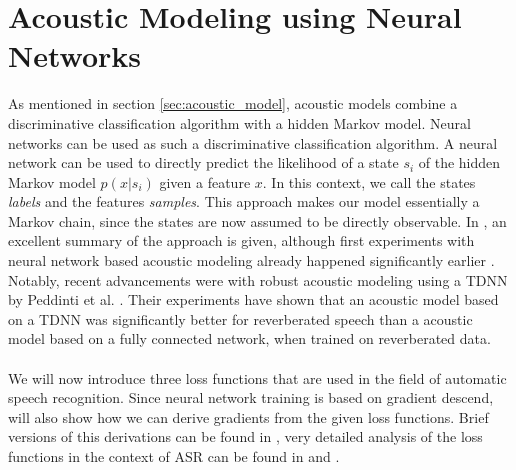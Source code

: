 \section{Acoustic Modeling using Neural Networks}

As mentioned in section \ref{sec:acoustic_model}, acoustic models combine a discriminative classification algorithm with a hidden Markov model. Neural networks can be used as such a discriminative classification algorithm. A neural network can be used to directly predict the likelihood of a state $s_i$ of the hidden Markov model $p(x|s_i)$ given a feature $x$. In this context, we call the states \textit{labels} and the features \textit{samples}. This approach makes our model essentially a Markov chain, since the states are now assumed to be directly observable. In \cite{hinton2012deep}, an excellent summary of the approach is given, although first experiments with neural network based acoustic modeling already happened significantly earlier \cite{bengio1993connectionist}. Notably, recent advancements were with robust acoustic modeling using a TDNN by Peddinti et al. \cite{peddinti2015reverberation} \cite{peddinti2015jhu}. Their experiments have shown that an acoustic model based on a TDNN was significantly better for reverberated speech than a acoustic model based on a fully connected network, when trained on reverberated data. \\ \\
We will now introduce three loss functions that are used in the field of automatic speech recognition. Since neural network training is based on gradient descend, will also show how we can derive gradients from the given loss functions. Brief versions of this derivations can be found in \cite{ghoshal2013sequence}, very detailed analysis of the loss functions in the context of ASR can be found in \cite{gibson2008minimum} and \cite{povey2005discriminative}.
